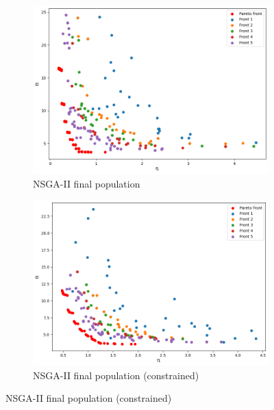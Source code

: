 \begin{figure}[H]
    \begin{subfigure}{0.5\textwidth}
        \includegraphics[width=\textwidth]{lab8/imgs/disk_nsga.png}
        \caption{NSGA-II final population}
    \end{subfigure}
    \begin{subfigure}{0.5\textwidth}
        \includegraphics[width=\textwidth]{lab8/imgs/disk_constr_nsga.png}
        \caption{NSGA-II final population (constrained)}
    \end{subfigure}
\end{figure}
